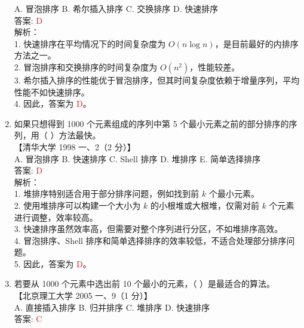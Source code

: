 \documentclass[lang=cn,newtx,10pt,scheme=chinese]{../../../elegantbook}
\begin{document}
\begin{enumerate}
    A. 冒泡排序 \quad B. 希尔插入排序 \quad C. 交换排序 \quad D. 快速排序 \\

    答案: \textcolor{red}{D} \\

    解析：\\
    1. 快速排序在平均情况下的时间复杂度为 $O(n \log n)$，是目前最好的内排序方法之一。\\
    2. 冒泡排序和交换排序的时间复杂度为 $O(n^2)$，性能较差。\\
    3. 希尔插入排序的性能优于冒泡排序，但其时间复杂度依赖于增量序列，平均性能不如快速排序。\\
    4. 因此，答案为 \textcolor{red}{D}。\\

    \item 如果只想得到 1000 个元素组成的序列中第 5 个最小元素之前的部分排序的序列，用（ ）方法最快。\\
    【清华大学 1998 一、2（2 分）】 \\

    A. 冒泡排序 \quad B. 快速排序 \quad C. Shell 排序 \quad D. 堆排序 \quad E. 简单选择排序 \\

    答案: \textcolor{red}{D} \\

    解析：\\
    1. 堆排序特别适合用于部分排序问题，例如找到前 $k$ 个最小元素。\\
    2. 使用堆排序可以构建一个大小为 $k$ 的小根堆或大根堆，仅需对前 $k$ 个元素进行调整，效率较高。\\
    3. 快速排序虽然效率高，但需要对整个序列进行分区，不如堆排序高效。\\
    4. 冒泡排序、Shell 排序和简单选择排序的效率较低，不适合处理部分排序问题。\\
    5. 因此，答案为 \textcolor{red}{D}。\\

    \item 若要从 1000 个元素中选出前 10 个最小的元素，（ ）是最适合的算法。\\
    【北京理工大学 2005 一、9（1 分）】 \\

    A. 直接插入排序 \quad B. 归并排序 \quad C. 堆排序 \quad D. 快速排序 \\

    答案: \textcolor{red}{C} \\


\end{enumerate}
\end{document}
